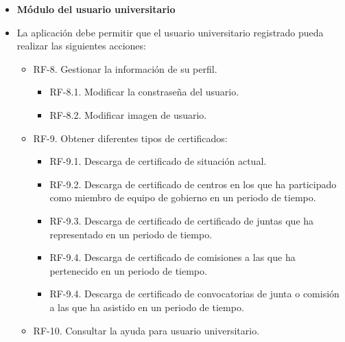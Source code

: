 \begin{itemize}
 \item \textbf{Módulo del usuario universitario}
 \item[] La aplicación debe permitir que el usuario universitario registrado pueda realizar las siguientes acciones: 
     \begin{itemize}
         \item RF-8. Gestionar la información de su perfil.
             \begin{itemize}
                 \item RF-8.1. Modificar la constraseña del usuario.
                 \item RF-8.2. Modificar imagen de usuario.
             \end{itemize}               
         \item RF-9. Obtener diferentes tipos de certificados:
             \begin{itemize}
                 \item RF-9.1. Descarga de certificado de situación actual.
                 \item RF-9.2. Descarga de certificado de centros en los que ha participado como miembro de equipo de gobierno en un periodo de tiempo.
                 \item RF-9.3. Descarga de certificado de certificado de juntas que ha representado en un periodo de tiempo.
                 \item RF-9.4. Descarga de certificado de comisiones a las que ha pertenecido en un periodo de tiempo.
                  \item RF-9.4. Descarga de certificado de convocatorias de junta o comisión a las que ha asistido en un periodo de tiempo.
             \end{itemize}            
         \item RF-10. Consultar la ayuda para usuario universitario.
     \end{itemize}


\end{itemize}
